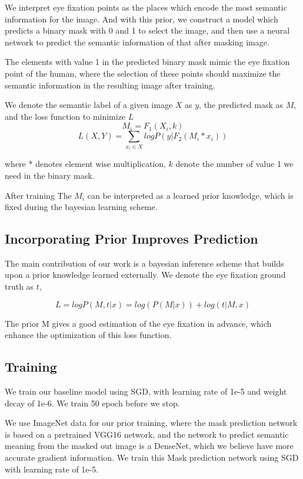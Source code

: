 \documentclass[10pt,twocolumn,letterpaper]{article}
\begin{document}
 We interpret eye fixation points as the places which encode the most semantic information for the image. And with this prior, we construct a model which predicts a binary mask with 0 and 1 to select the image, and then use a neural network to predict the semantic information of that after masking image. 
 
 The elements with value 1 in the predicted binary mask mimic the eye fixation point of the human, where the selection of these points should maximize the semantic information in the resulting image after training.
 
 We denote the semantic label of a given image $X$ as $y$, the predicted mask as $M$, and the loss function to minimize $L$
 $$M_i = F_1(X_i, k)$$
 $$L(X, Y) = \sum_{x_i \in X}{logP(y | F_2(M_i * x_i))}$$
 
 where * denotes element wise multiplication, $k$ denote the number of value 1 we need in the binary mask.
 
 After training The $M_i$ can be interpreted as a learned prior knowledge, which is fixed during the bayesian learning scheme.
 
 \subsection{Incorporating Prior Improves Prediction}
 
 The main contribution of our work is a bayesian inference scheme that builds upon a prior knowledge learned externally. We denote the eye fixation ground truth as $t$, 
 
 $$L = logP(M, t|x) = log(P(M|x)) + log(t|M, x)$$
 
 The prior M gives a good estimation of the eye fixation in advance, which enhance the optimization of this loss function.
 
 
 
\subsection{Training}
We train our baseline model using SGD, with learning rate of 1e-5 and weight decay of 1e-6. We train 50 epoch before we stop.

We use ImageNet data for our prior training, where the mask prediction network is based on a pretrained VGG16 network, and the network to predict semantic meaning from the masked out image is a DenseNet, which we believe have more accurate gradient information. We train this Mask prediction network using SGD with learning rate of 1e-5.
\end{document}
